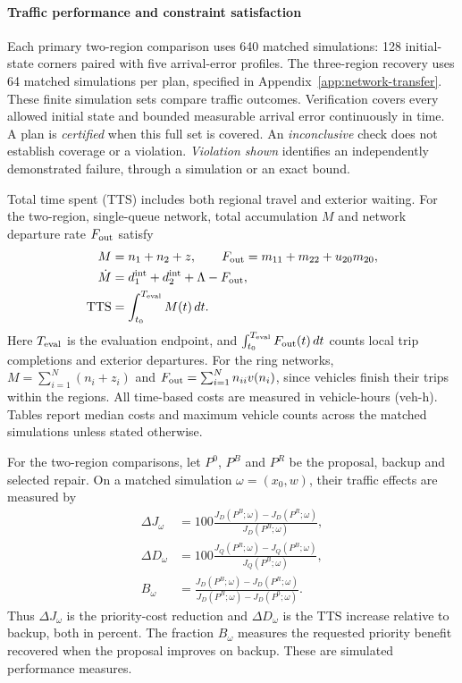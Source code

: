 \documentclass[final]{cas-sc}
\theoremstyle{definition}
\theoremstyle{plain}
\theoremstyle{definition}
\theoremstyle{plain}
\newcommand{\appref}[1]{Appendix~\ref{#1}}
\begin{document}
\paragraph{Traffic performance and constraint satisfaction}
Each primary two-region comparison uses 640 matched simulations:
128 initial-state corners paired with five arrival-error profiles.
The three-region recovery uses 64 matched simulations per plan,
specified in \appref{app:network-transfer}. These finite simulation
sets compare traffic outcomes. Verification covers every
allowed initial state and bounded measurable arrival error continuously
in time. A plan is \emph{certified} when this full set is covered. An
\emph{inconclusive} check does not establish coverage or a violation.
\emph{Violation shown} identifies an independently demonstrated failure,
through a simulation or an exact bound.

Total time spent (TTS) includes both regional travel and exterior waiting.
For the two-region, single-queue network, total accumulation $M$
and network departure rate $F_{\rm out}$ satisfy
\begin{equation}
\begin{aligned}
M&=n_1+n_2+z,\qquad F_{\rm out}=m_{11}+m_{22}+u_{20}m_{20},\\
\dot M&=d_1^{\rm int}+d_2^{\rm int}+\Lambda-F_{\rm out},\\
\mathrm{TTS}&=\int_{t_0}^{T_{\rm eval}}M(t)\,dt.
\end{aligned}
\label{eq:new-conservation}
\end{equation}
Here $T_{\rm eval}$ is the evaluation endpoint, and
$\int_{t_0}^{T_{\rm eval}}F_{\rm out}(t)\,dt$ counts local trip
completions and exterior departures. For the ring networks,
$M=\sum_{i=1}^N(n_i+z_i)$ and
$F_{\rm out}=\sum_{i=1}^N n_{ii}v(n_i)$, since vehicles finish their
trips within the regions. All time-based costs are measured in
vehicle-hours (veh-h). Tables report median
costs and maximum vehicle counts across the matched simulations unless
stated otherwise.

For the two-region comparisons, let $P^0$, $P^B$ and $P^R$ be the
proposal, backup and selected repair. On a matched simulation
$\omega=(x_0,w)$, their traffic effects are measured by
\begin{equation}
\begin{aligned}
\Delta J_\omega&=100\frac{J_D(P^B;\omega)-J_D(P^R;\omega)}{J_D(P^B;\omega)},\\
\Delta D_\omega&=100\frac{J_Q(P^R;\omega)-J_Q(P^B;\omega)}{J_Q(P^B;\omega)},\\
B_\omega&=\frac{J_D(P^B;\omega)-J_D(P^R;\omega)}{J_D(P^B;\omega)-J_D(P^0;\omega)}.
\end{aligned}
\label{eq:benchmark-repair-metrics}
\end{equation}
Thus $\Delta J_\omega$ is the priority-cost reduction and
$\Delta D_\omega$ is the TTS increase relative to backup, both in
percent. The fraction $B_\omega$ measures the requested priority benefit
recovered when the proposal improves on backup. These are simulated
performance measures.
\end{document}

